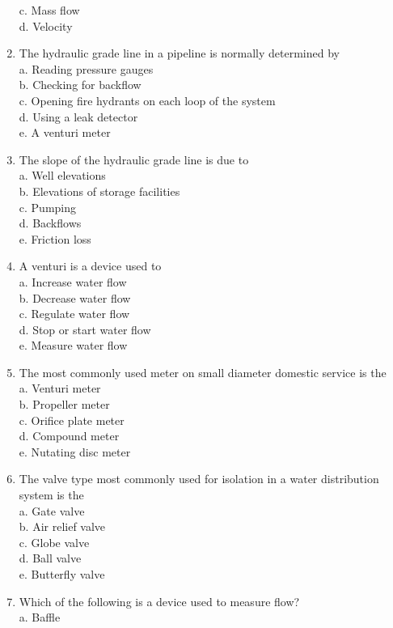 \begin{enumerate}[1.]
c. Mass flow\\
d. Velocity\\
\item The hydraulic grade line in a pipeline is normally determined by\\
a. Reading pressure gauges\\
b. Checking for backflow\\
c. Opening fire hydrants on each loop of the system\\
d. Using a leak detector\\
e. A venturi meter\\
\item The slope of the hydraulic grade line is due to\\
a. Well elevations\\
b. Elevations of storage facilities\\
c. Pumping\\
d. Backflows\\
e. Friction loss\\
\item A venturi is a device used to\\
a. Increase water flow\\
b. Decrease water flow\\
c. Regulate water flow\\
d. Stop or start water flow\\
e. Measure water flow\\
\item The most commonly used meter on small diameter domestic service is the\\
a. Venturi meter\\
b. Propeller meter\\
c. Orifice plate meter\\
d. Compound meter\\
e. Nutating disc meter\\
\item The valve type most commonly used for isolation in a water distribution system is the\\
a. Gate valve\\
b. Air relief valve\\
c. Globe valve\\
d. Ball valve\\
e. Butterfly valve\\
\item Which of the following is a device used to measure flow?\\
a. Baffle\\

\end{enumerate}
